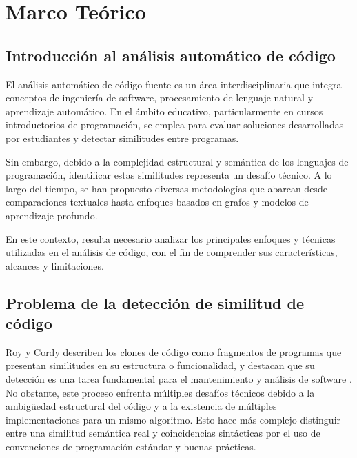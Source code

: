 \chapter{Marco Teórico}

\section{Introducción al análisis automático de código}

El análisis automático de código fuente es un área interdisciplinaria que integra conceptos de ingeniería de software, procesamiento de lenguaje natural y aprendizaje automático. En el ámbito educativo, particularmente en cursos introductorios de programación, se emplea para evaluar soluciones desarrolladas por estudiantes y detectar similitudes entre programas.

Sin embargo, debido a la complejidad estructural y semántica de los lenguajes de programación, identificar estas similitudes representa un desafío técnico. A lo largo del tiempo, se han propuesto diversas metodologías que abarcan desde comparaciones textuales hasta enfoques basados en grafos y modelos de aprendizaje profundo.

En este contexto, resulta necesario analizar los principales enfoques y técnicas utilizadas en el análisis de código, con el fin de comprender sus características, alcances y limitaciones.


\section{Problema de la detección de similitud de código}

Roy y Cordy describen los clones de código como fragmentos de programas que presentan similitudes en su estructura o funcionalidad, y destacan que su detección es una tarea fundamental para el mantenimiento y análisis de software \cite{Roy2007Survey}. No obstante, este proceso enfrenta múltiples desafíos técnicos debido a la ambigüedad estructural del código y a la existencia de múltiples implementaciones para un mismo algoritmo. Esto hace más complejo distinguir entre una similitud semántica real y coincidencias sintácticas por el uso de convenciones de programación estándar y buenas prácticas.


